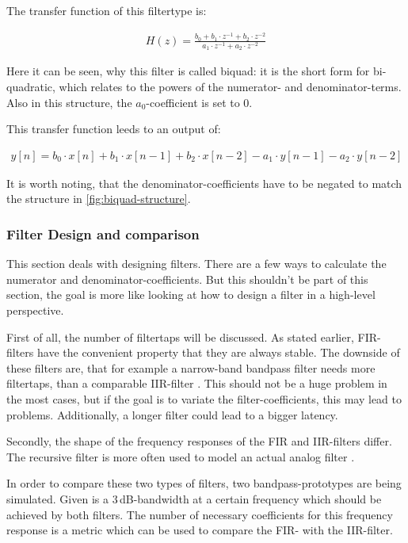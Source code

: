 The transfer function of this filtertype is:

\begin{align}
    H(z) = \frac{b_0 + b_1 \cdot z^{-1} + b_2 \cdot z^{-2}}{a_1 \cdot z^{-1} + a_2 \cdot z^{-2}}
\end{align}

Here it can be seen, why this filter is called \frqq biquad\flqq{}: it is the short form for
\frqq bi-quadratic\flqq{}, which relates to the powers of the numerator- and denominator-terms.
Also in this structure, the $a_0$-coefficient is set to $0$.

This transfer function leeds to an output of:

\begin{align}
    y[n] = b_0 \cdot x[n] + b_1 \cdot x[n-1] + b_2 \cdot x[n-2] - a_1 \cdot y[n-1] - a_2 \cdot y[n-2]
\end{align}

It is worth noting, that the denominator-coefficients have to be negated to match the structure in
\autoref{fig:biquad-structure}.


\subsubsection{Filter Design and comparison}

This section deals with designing filters. There are a few ways to calculate the numerator and
denominator-coefficients. But this shouldn't be part of this section, the goal is more like looking at
how to design a filter in a high-level perspective.

First of all, the number of filtertaps will be discussed. As stated earlier, \ac{FIR}-filters have
the convenient property that they are always stable. The downside of these filters are,
that for example a narrow-band bandpass filter needs more filtertaps, than a comparable
\ac{IIR}-filter \cite{meyer_signalverarbeitung}. This should not be a huge problem in the most cases,
but if the goal is to variate the filter-coefficients, this may lead to problems. Additionally, a longer filter
could lead to a bigger latency.

Secondly, the shape of the frequency responses of the \ac{FIR} and \ac{IIR}-filters differ. The recursive filter
is more often used to model an actual analog filter \cite{meyer_signalverarbeitung}.

In order to compare these two types of filters, two bandpass-prototypes are being simulated. Given
is a 3\,dB-bandwidth at a certain frequency which should be achieved by both filters. The number of necessary
coefficients for this frequency response is a metric which can be used to compare the \ac{FIR}-
with the \ac{IIR}-filter.

